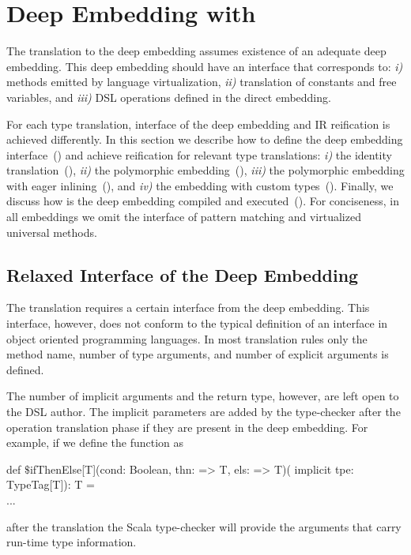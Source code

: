 \section{Deep Embedding with \yy}
\label{sec:deep-embedding-implementations}

The translation to the deep embedding assumes existence of an adequate deep embedding. This deep embedding
should have an interface that corresponds to: \emph{i)} methods emitted by language virtualization,
\emph{ii)} translation of constants and free variables, and \emph{iii)} DSL operations defined in
 the direct embedding.

 For each type translation, interface of the deep embedding and IR reification is
  achieved differently. In this section we describe
  how to define the deep embedding interface~() and achieve reification
  for relevant type translations:
   \emph{i)} the identity translation~(),
   \emph{ii)} the polymorphic embedding~(),
   \emph{iii)} the polymorphic embedding with eager inlining~(), and
   \emph{iv)} the embedding with custom types~().
  Finally, we discuss how is the deep embedding compiled and executed~(). For conciseness,
   in all embeddings we omit the interface of pattern matching and virtualized universal methods.

\subsection{Relaxed Interface of the Deep Embedding}
\label{sec:relaxed-interface}

The \yy translation requires a certain interface from the deep embedding. This interface, however,
 does not conform to the typical definition of an interface in object oriented programming languages.
 In most translation rules only the method name, number of type arguments, and number
 of explicit arguments is defined.

The number of implicit arguments and the return type, however, are left open to
 the DSL author. The implicit parameters are added by the type-checker after the operation translation
 phase if they are present in the deep embedding.
 For example, if we define the  function as\begin{lstparagraph}
def $\$$ifThenElse[T](cond: Boolean, thn: => T, els: => T)(
  implicit tpe: TypeTag[T]): T = \\...
\end{lstparagraph}
after the translation the Scala type-checker will provide the arguments that carry run-time type information.

